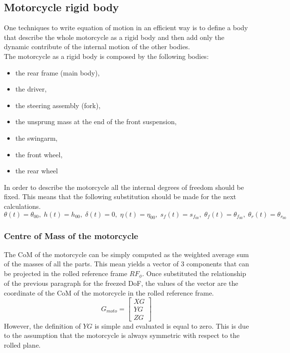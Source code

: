 \subsection{Motorcycle rigid body}
One techniques to write equation of motion in an efficient way is to define a body that describe the whole motorcycle as a rigid body and then add only the dynamic contribute of the internal motion of the other bodies.\\
The motorcycle as a rigid body is composed by the following bodies:
\begin{itemize}
    \item the rear frame (main body),
    \item the driver,
    \item the steering  assembly (fork),
    \item the unsprung mass at the end of the front suspension,
    \item the swingarm,
    \item the front wheel,
    \item the rear wheel
\end{itemize}
%
In order to describe the motorcycle all the internal degrees of freedom should be fixed. This means that the following substitution should be made for the next calculations.
%
\begin{equation*}
    \theta \left( t \right) =\theta_{00},\;h
    \left( t \right) =h_{00},\;\delta \left( t \right) =0,\;\eta \left( t
    \right) =\eta_{00},\;s_{f} \left( t \right) =s_{f_{00}},\;\theta_{f}
    \left( t \right) =\theta_{f_{00}},\;\theta_{r} \left( t \right) =\theta
   _{r_{00}}   
\end{equation*}
%
\subsubsection{Centre of Mass of the motorcycle}
%
The CoM of the motorcycle can be simply computed as the weighted average sum of the masses of all the parts. This mean yields a vector of 3 components that can be projected in the rolled reference frame $RF_\phi$. Once substituted the relationship of the previous paragraph for the freezed DoF, the values of the vector are the coordinate of the CoM of the motorcycle in the rolled reference frame. 
\begin{equation}
    G_{moto} = 
    \left[ \begin{array}{l}
        XG\\
        YG\\
        ZG
    \end{array} \right]
\end{equation}
However, the definition of $YG$ is simple and evaluated is equal to zero. This is due to the assumption that the motorcycle is always symmetric with respect to the rolled plane.
%
